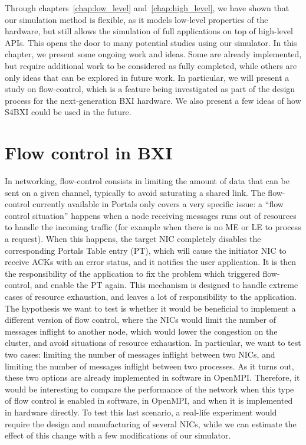 Through chapters~\ref{chap:low_level} and~\ref{chap:high_level}, we have shown
that our simulation method is flexible, as it models low-level properties of the
hardware, but still allows the simulation of full applications on top of
high-level APIs. This opens the door to many potential studies using our
simulator. In this chapter, we present some ongoing work and ideas. Some are
already implemented, but require additional work to be considered as fully
completed, while others are only ideas that can be explored in future work. In
particular, we will present a study on flow-control, which is a feature being
investigated as part of the design process for the next-generation BXI hardware.
We also present a few ideas of how S4BXI could be used in the future.

\section{Flow control in BXI}

In networking, flow-control consists in limiting the amount of data that can be
sent on a given channel, typically to avoid saturating a shared link. The
flow-control currently available in Portals only covers a very specific issue: a
``flow control situation'' happens when a node receiving messages runs out of
resources to handle the incoming traffic (for example when there is no ME or LE
to process a request). When this happens, the target NIC completely disables the
corresponding Portals Table entry (PT), which will cause the initiator NIC to
receive ACKs with an error status, and it notifies the user application. It is
then the responsibility of the application to fix the problem which triggered
flow-control, and enable the PT again. This mechanism is designed to handle
extreme cases of resource exhaustion, and leaves a lot of responsibility to the
application. The hypothesis we want to test is whether it would be beneficial to
implement a different version of flow control, where the NICs would limit the
number of messages inflight to another node, which would lower the congestion on
the cluster, and avoid situations of resource exhaustion. In particular, we want
to test two cases: limiting the number of messages inflight between two NICs,
and limiting the number of messages inflight between two processes. As it turns
out, these two options are already implemented in software in OpenMPI.
Therefore, it would be interesting to compare the performance of the network
when this type of flow control is enabled in software, in OpenMPI, and when it
is implemented in hardware directly. To test this last scenario, a real-life
experiment would require the design and manufacturing of several NICs, while we
can estimate the effect of this change with a few modifications of our
simulator.

